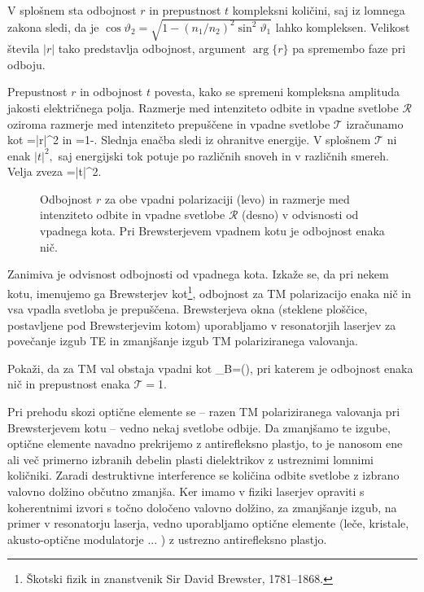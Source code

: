 V splošnem sta odbojnost $r$ in prepustnost $t$ kompleksni
količini, saj iz lomnega zakona sledi, da je $\cos\vartheta_{2}=
\sqrt{1-\left(n_{1}/n_{2}\right)^{2}\sin^{2}\vartheta_{1}}$
lahko kompleksen. Velikost števila $\left|r\right|$ tako predstavlja
odbojnost, argument $\arg\{r\}$ pa spremembo faze
pri odboju.

Prepustnost $r$ in odbojnost $t$ povesta, kako se spremeni kompleksna
amplituda jakosti električnega polja. Razmerje med intenziteto odbite
in vpadne svetlobe $\mathcal{R}$ oziroma razmerje med intenziteto prepuščene in vpadne svetlobe
$\mathcal{T}$ izračunamo kot 
\beq
{}=\left|r\right|^{2}
\eeq
in
\beq
{}=1-.
\eeq
Slednja enačba sledi iz ohranitve energije. V splošnem $\mathcal{T}$
ni enak $\left|t\right|^{2},$ saj energijski tok potuje po različnih
snoveh in v različnih smereh. Velja zveza
\beq
{}=\left|t\right|^{2}.
\eeq

\begin{figure}[h]
\centering
  \def\svgwidth{70truemm} 
  
  \def\svgwidth{70truemm} 
  
\caption{Odbojnost $r$ za obe vpadni polarizaciji (levo) in razmerje med intenziteto odbite
in vpadne svetlobe $\mathcal{R}$ (desno) v odvisnosti od vpadnega kota. Pri Brewsterjevem vpadnem 
kotu je odbojnost enaka nič.}
\label{fig:Brewster}
\end{figure}

Zanimiva je odvisnost odbojnosti od vpadnega kota. Izkaže se, da pri nekem kotu, 
imenujemo ga Brewsterjev kot\footnote{Škotski fizik in znanstvenik Sir David Brewster, 1781--1868.}, 
odbojnost za TM polarizacijo enaka nič in vsa vpadla
svetloba je prepuščena. Brewsterjeva
okna (steklene ploščice, postavljene pod Brewsterjevim kotom) uporabljamo
v resonatorjih laserjev za povečanje izgub TE in zmanjšanje izgub
TM polariziranega valovanja.

\begin{definition}
Pokaži, da za TM val obstaja vpadni kot
\beq
\vartheta_{B}=\arctan\left(\right),
\eeq
pri katerem je odbojnost enaka nič in prepustnost enaka $\mathcal{T}=$1.
\end{definition}

\begin{remark}
Pri prehodu skozi optične elemente se --
razen TM polariziranega valovanja pri Brewsterjevem 
kotu -- vedno nekaj
svetlobe odbije. Da zmanjšamo te izgube, optične elemente navadno
prekrijemo z antirefleksno plastjo, to je nanosom ene ali več primerno
izbranih debelin plasti dielektrikov z ustreznimi lomnimi količniki.
Zaradi destruktivne interference se količina odbite svetlobe z izbrano
valovno dolžino občutno zmanjša. Ker imamo v fiziki laserjev opraviti
s koherentnimi izvori s točno določeno valovno dolžino, za zmanjšanje
izgub, na primer v resonatorju laserja, vedno uporabljamo optične
elemente (leče, kristale, akusto-optične modulatorje ... ) z ustrezno
antirefleksno plastjo.
\end{remark}

